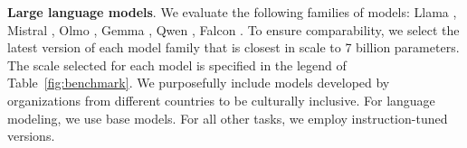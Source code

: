 \documentclass[11pt,a4paper]{article}
\begin{document}
\smallskip


\noindent\textbf{Large language models}.
We evaluate the following families of models: Llama \citep{dubey2024llama}, Mistral \citep{jiang2023mistral}, Olmo \citep{groeneveld2024olmo}, Gemma \citep{team2024gemma}, Qwen \citep{yang2024qwen2}, Falcon \citep{almazrouei2023falcon}.
To ensure comparability, we select the latest version of each model family that is closest in scale to 7 billion parameters. The scale selected for each model is specified in the legend of Table~\ref{fig:benchmark}. We purposefully include models developed by organizations from different countries to be culturally inclusive. For language modeling, we use base models. For all other tasks, we employ instruction-tuned versions. %






    



    
\end{document}

